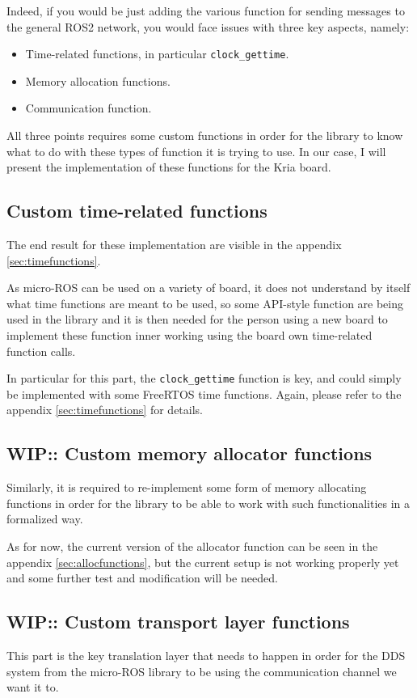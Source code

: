 \documentclass[10pt]{article}
\begin{document}
Indeed, if you would be just adding the various function for sending messages to
the general ROS2 network, you would face issues with three key aspects, namely:
\begin{itemize}
\item Time-related functions, in particular \verb|clock_gettime|.
\item Memory allocation functions.
\item Communication function.
\end{itemize}

All three points requires some custom functions in order for the library to
know what to do with these types of function it is trying to use.
In our case, I will present the implementation of these functions for the
Kria board.

\subsection{Custom time-related functions}
The end result for these implementation are visible in the appendix
\ref{sec:timefunctions}.

As micro-ROS can be used on a variety of board, it does not understand by itself
what time functions are meant to be used, so some API-style function are being
used in the library and it is then needed for the person using a new board
to implement these function inner working using the board own time-related
function calls.

In particular for this part, the \verb|clock_gettime| function is key, and could
simply be implemented with some FreeRTOS time functions.
Again, please refer to the appendix \ref{sec:timefunctions} for details.

\subsection{WIP:: Custom memory allocator functions}
Similarly, it is required to re-implement some form of memory allocating
functions in order for the library to be able to work with such functionalities
in a formalized way.

As for now, the current version of the allocator function can be seen in the
appendix \ref{sec:allocfunctions}, but the current setup is not working
properly yet and some further test and modification will be needed.

\subsection{WIP:: Custom transport layer functions}
This part is the key translation layer that needs to happen in order for the
DDS system from the micro-ROS library to be using the communication channel we
want it to.
\end{document}

